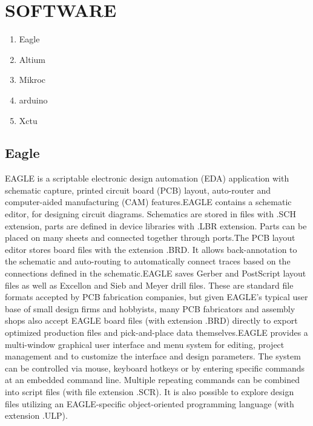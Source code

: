 \documentclass[12pt,a4paper]{report}
\begin{document}
\section{SOFTWARE}

\begin{enumerate}
\item Eagle

\item Altium
\item Mikroc
\item arduino
\item Xctu
\end{enumerate}
\subsection{Eagle}
  \hspace*{1cm} EAGLE is a scriptable electronic design automation (EDA) application with schematic capture, printed circuit board (PCB) layout, auto-router and computer-aided manufacturing (CAM) features.EAGLE contains a schematic editor, for designing circuit diagrams. Schematics are stored in files with .SCH extension, parts are defined in device libraries with .LBR extension. Parts can be placed on many sheets and connected together through ports.The PCB layout editor stores board files with the extension .BRD. It allows back-annotation to the schematic and auto-routing to automatically connect traces based on the connections defined in the schematic.EAGLE saves Gerber and PostScript layout files as well as Excellon and Sieb and Meyer drill files. These are standard file formats accepted by PCB fabrication companies, but given EAGLE's typical user base of small design firms and hobbyists, many PCB fabricators and assembly shops also accept EAGLE board files (with extension .BRD) directly to export optimized production files and pick-and-place data themselves.EAGLE provides a multi-window graphical user interface and menu system for editing, project management and to customize the interface and design parameters. The system can be controlled via mouse, keyboard hotkeys or by entering specific commands at an embedded command line. Multiple repeating commands can be combined into script files (with file extension .SCR). It is also possible to explore design files utilizing an EAGLE-specific object-oriented programming language (with extension .ULP).
\end{document}

